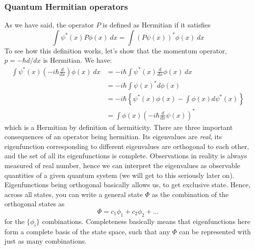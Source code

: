 \subsubsection{Quantum Hermitian operators}
As we have said, the operator $P$ is defined as Hermitian if it satisfies 
\begin{equation}
    \int \psi^{*}(x) P \phi(x) \: dx = \int (P \psi(x))^{*}\phi(x)\: dx
\end{equation}
To see how this definition works, let's show that the momentum operator, $p=-\hbar d/dx$ is Hermitian. We have: 
\begin{align}
    \int \psi^{*}(x) \left(-i\hbar \frac{d}{dx}\right)\phi(x)\: dx 
    & = -i\hbar \int \psi^{*}(x)\frac{d}{dx}\phi(x)\: dx \\
    & = -i\hbar \int \psi(x)^{*} d\phi(x)\\
    & = -i\hbar \left\{ \psi^{*}(x)\phi(x) - \int \phi(x)d\psi^{*}(x) \right\}\\
    & = \int \phi(x)\left(-i\hbar \frac{d}{dx}\psi(x)\right)^{*}
\end{align}
which is a Hermitian by definition of hermiticity. There are three important consequences of an operator being hermitian. Its eigenvalues are \textit{real}, its eigenfunction corresponding to different eigenvalues are orthogonal to each other, and the set of all its eigenfunctions is complete. Observations in reality is always measured of real number, hence we can interpret the eigenvalues as observable quantities of a given quantum system (we will get to this seriously later on). Eigenfunctions being orthogonal basically allows us, to get exclusive state. Hence, across all states, you can write a general state $\Phi$ as the combination of the orthogonal states as 
\begin{equation}
    \Phi = c_{1}\phi_{1} + c_{2}\phi_{2} + \dots 
\end{equation}
for the $\{\phi_{i}\}$ combinations. Completeness basically means that eigenfunctions here form a complete basis of the state space, such that any $\Phi$ can be represented with just as many combinations. 